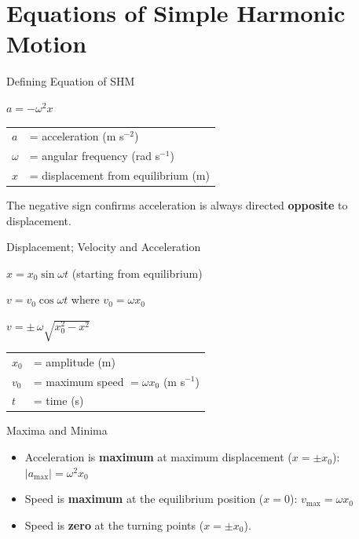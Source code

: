 \section{Equations of Simple Harmonic Motion}

\begin{formulabox}{Defining Equation of SHM}
\begin{center}
\Large $a = -\omega^2 x$
\end{center}
\vspace{0.3em}
\begin{tabular}{@{}ll@{}}
$a$ & = acceleration (m s$^{-2}$) \\
$\omega$ & = angular frequency (rad s$^{-1}$) \\
$x$ & = displacement from equilibrium (m) \\
\end{tabular}
\vspace{0.4em}

The negative sign confirms acceleration is always directed \textbf{opposite} to displacement.
\end{formulabox}

\begin{formulabox}{Displacement; Velocity and Acceleration}
\begin{center}
\large
$x = x_0 \sin\omega t$ \qquad (starting from equilibrium)
\end{center}
\vspace{0.3em}
\begin{center}
\large
$v = v_0 \cos\omega t$ \qquad where $v_0 = \omega x_0$
\end{center}
\vspace{0.3em}
\begin{center}
\large
$v = \pm\,\omega\sqrt{x_0^2 - x^2}$
\end{center}
\vspace{0.4em}
\begin{tabular}{@{}ll@{}}
$x_0$ & = amplitude (m) \\
$v_0$ & = maximum speed $= \omega x_0$ (m s$^{-1}$) \\
$t$ & = time (s) \\
\end{tabular}
\end{formulabox}

\begin{keybox}{Maxima and Minima}
\begin{itemize}[itemsep=2pt]
  \item Acceleration is \textbf{maximum} at maximum displacement ($x = \pm x_0$): \quad $|a_{\max}| = \omega^2 x_0$
  \item Speed is \textbf{maximum} at the equilibrium position ($x = 0$): \quad $v_{\max} = \omega x_0$
  \item Speed is \textbf{zero} at the turning points ($x = \pm x_0$).
\end{itemize}
\end{keybox}

